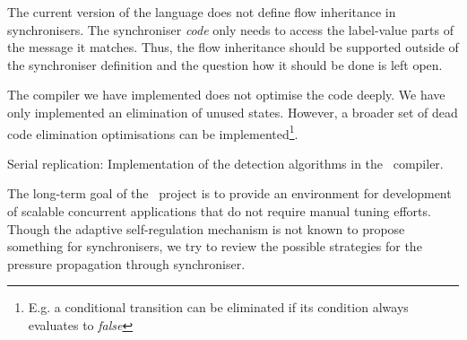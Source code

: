 The current version of the language does not define flow inheritance in synchronisers. The synchroniser \emph{code} only needs to access the label-value parts of the message it matches. Thus, the flow inheritance should be supported outside of the synchroniser definition and the question how it should be done is left open.

The compiler we have implemented does not optimise the code deeply. We have only implemented an elimination of unused states. However, a broader set of dead code elimination optimisations can be implemented\footnote{E.g. a conditional transition can be eliminated if its condition always evaluates to \emph{false}}.

Serial replication:
Implementation of the detection algorithms in the \ak\ compiler.

The long-term goal of the \ak\ project is to provide an environment for development of scalable concurrent applications that do not require manual tuning efforts. Though the adaptive self-regulation mechanism is not known to propose something for synchronisers, we try to review the possible strategies for the pressure propagation through synchroniser.

